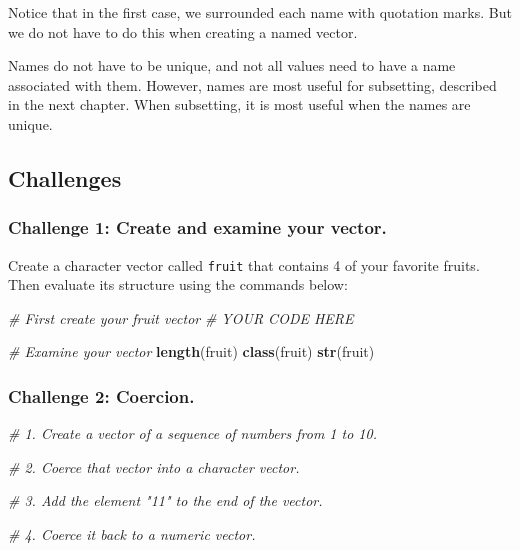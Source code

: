 \documentclass[
]{book}
\newenvironment{Shaded}{\begin{snugshade}}{\end{snugshade}}
\newcommand{\CommentTok}[1]{\textcolor[rgb]{0.56,0.35,0.01}{\textit{#1}}}
\newcommand{\KeywordTok}[1]{\textcolor[rgb]{0.13,0.29,0.53}{\textbf{#1}}}
\newcommand{\NormalTok}[1]{#1}
\begin{document}
Notice that in the first case, we surrounded each name with quotation marks. But we do not have to do this when creating a named vector.

Names do not have to be unique, and not all values need to have a name associated with them. However, names are most useful for subsetting, described in the next chapter. When subsetting, it is most useful when the names are unique.

\hypertarget{challenges-11}{%
\subsection{Challenges}\label{challenges-11}}

\hypertarget{challenge-1-create-and-examine-your-vector.}{%
\subsubsection*{Challenge 1: Create and examine your vector.}\label{challenge-1-create-and-examine-your-vector.}}

Create a character vector called \texttt{fruit} that contains 4 of your favorite fruits. Then evaluate its structure using the commands below:

\begin{Shaded}
\begin{Highlighting}[]

\CommentTok{# First create your fruit vector }
\CommentTok{# YOUR CODE HERE}


\CommentTok{# Examine your vector}
\KeywordTok{length}\NormalTok{(fruit)}
\KeywordTok{class}\NormalTok{(fruit)}
\KeywordTok{str}\NormalTok{(fruit)}
\end{Highlighting}
\end{Shaded}

\hypertarget{challenge-2-coercion.}{%
\subsubsection*{Challenge 2: Coercion.}\label{challenge-2-coercion.}}

\begin{Shaded}
\begin{Highlighting}[]

\CommentTok{# 1. Create a vector of a sequence of numbers from 1 to 10.}

\CommentTok{# 2. Coerce that vector into a character vector.}

\CommentTok{# 3. Add the element "11" to the end of the vector.}

\CommentTok{# 4. Coerce it back to a numeric vector.}
\end{Highlighting}
\end{Shaded}
\end{document}
